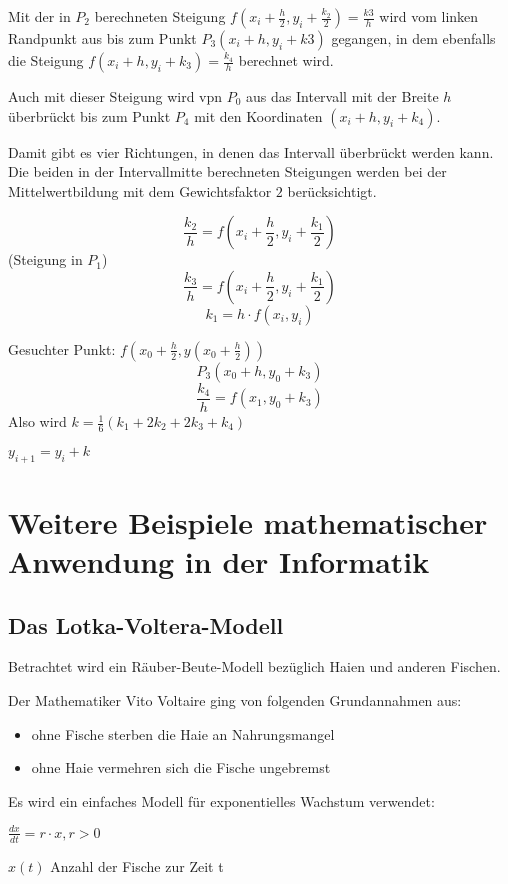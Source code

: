 \documentclass[fontset=ubuntu,11pt,a4paper,fleqn,headsepline]{scrreprt}
\begin{document}
\begin{multicols}{2}
    Mit der in \(P_2\) berechneten Steigung \(f(x_i+\frac{h}{2},y_i+\frac{k_2}{2})=\frac{k3}{h}\) wird vom linken Randpunkt aus bis zum Punkt \(P_3(x_i+h,y_i+k3)\) gegangen, in dem ebenfalls die Steigung \(f(x_i+h,y_i+k_3)=\frac{k_4}{h}\) berechnet wird. 
    
    Auch mit dieser Steigung wird vpn $P_0$ aus das Intervall mit der Breite $h$ überbrückt bis zum Punkt $P_4$ mit den Koordinaten $(x_i+h,y_i+k_4)$.
    
    Damit gibt es vier Richtungen, in denen das Intervall überbrückt werden kann. Die beiden in der Intervallmitte berechneten Steigungen werden bei der Mittelwertbildung mit dem Gewichtsfaktor $2$ berücksichtigt.
    
    \[\frac{k_2}{h}=f\left(x_i+\frac{h}{2},y_i+\frac{k_1}{2}\right)\] (Steigung in \(P_1\))
    \[\frac{k_3}{h}=f\left(x_i+\frac{h}{2},y_i+\frac{k_1}{2}\right)\]
    \[k_1=h\cdot f(x_i,y_i)\]
    
    Gesuchter Punkt: \(f\left(x_0+\frac{h}{2},y\left(x_0+\frac{h}{2}\right)\right)\)
    \[P_3(x_0+h,y_0+k_3)\]
    \[\frac{k_4}{h}=f(x_1,y_0+k_3)\]
    Also wird \(k=\frac{1}{6}(k_1+2k_2+2k_3+k_4)\)
    
    \(y_{i+1}=y_i+k\)
    
    \chapter*{Weitere Beispiele mathematischer Anwendung in der Informatik}
    \section*{Das Lotka-Voltera-Modell}
    Betrachtet wird ein Räuber-Beute-Modell bezüglich Haien und anderen Fischen.
    
    Der Mathematiker Vito Voltaire ging von folgenden Grundannahmen aus:
    
    \begin{itemize}
        \item ohne Fische sterben die Haie an Nahrungsmangel 
        \item ohne Haie vermehren sich die Fische ungebremst
    \end{itemize}
    
    Es wird ein einfaches Modell für exponentielles Wachstum verwendet:
    
    \(\frac{dx}{dt}=r\cdot x, r>0\)
    
    $x(t)$ Anzahl der Fische zur Zeit t
    

\end{multicols}
\end{document}
